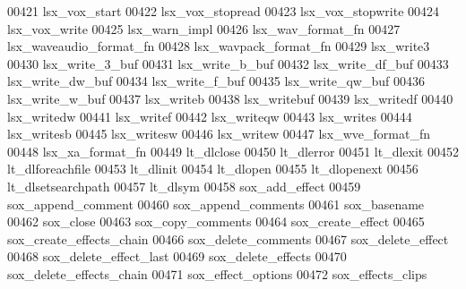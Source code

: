 \begin{DoxyCode}
00421 \textcolor{stringliteral}{lsx\_vox\_start}
00422 \textcolor{stringliteral}{lsx\_vox\_stopread}
00423 \textcolor{stringliteral}{lsx\_vox\_stopwrite}
00424 \textcolor{stringliteral}{lsx\_vox\_write}
00425 \textcolor{stringliteral}{lsx\_warn\_impl}
00426 \textcolor{stringliteral}{lsx\_wav\_format\_fn}
00427 \textcolor{stringliteral}{lsx\_waveaudio\_format\_fn}
00428 \textcolor{stringliteral}{lsx\_wavpack\_format\_fn}
00429 \textcolor{stringliteral}{lsx\_write3}
00430 \textcolor{stringliteral}{lsx\_write\_3\_buf}
00431 \textcolor{stringliteral}{lsx\_write\_b\_buf}
00432 \textcolor{stringliteral}{lsx\_write\_df\_buf}
00433 \textcolor{stringliteral}{lsx\_write\_dw\_buf}
00434 \textcolor{stringliteral}{lsx\_write\_f\_buf}
00435 \textcolor{stringliteral}{lsx\_write\_qw\_buf}
00436 \textcolor{stringliteral}{lsx\_write\_w\_buf}
00437 \textcolor{stringliteral}{lsx\_writeb}
00438 \textcolor{stringliteral}{lsx\_writebuf}
00439 \textcolor{stringliteral}{lsx\_writedf}
00440 \textcolor{stringliteral}{lsx\_writedw}
00441 \textcolor{stringliteral}{lsx\_writef}
00442 \textcolor{stringliteral}{lsx\_writeqw}
00443 \textcolor{stringliteral}{lsx\_writes}
00444 \textcolor{stringliteral}{lsx\_writesb}
00445 \textcolor{stringliteral}{lsx\_writesw}
00446 \textcolor{stringliteral}{lsx\_writew}
00447 \textcolor{stringliteral}{lsx\_wve\_format\_fn}
00448 \textcolor{stringliteral}{lsx\_xa\_format\_fn}
00449 \textcolor{stringliteral}{lt\_dlclose}
00450 \textcolor{stringliteral}{lt\_dlerror}
00451 \textcolor{stringliteral}{lt\_dlexit}
00452 \textcolor{stringliteral}{lt\_dlforeachfile}
00453 \textcolor{stringliteral}{lt\_dlinit}
00454 \textcolor{stringliteral}{lt\_dlopen}
00455 \textcolor{stringliteral}{lt\_dlopenext}
00456 \textcolor{stringliteral}{lt\_dlsetsearchpath}
00457 \textcolor{stringliteral}{lt\_dlsym}
00458 \textcolor{stringliteral}{sox\_add\_effect}
00459 \textcolor{stringliteral}{sox\_append\_comment}
00460 \textcolor{stringliteral}{sox\_append\_comments}
00461 \textcolor{stringliteral}{sox\_basename}
00462 \textcolor{stringliteral}{sox\_close}
00463 \textcolor{stringliteral}{sox\_copy\_comments}
00464 \textcolor{stringliteral}{sox\_create\_effect}
00465 \textcolor{stringliteral}{sox\_create\_effects\_chain}
00466 \textcolor{stringliteral}{sox\_delete\_comments}
00467 \textcolor{stringliteral}{sox\_delete\_effect}
00468 \textcolor{stringliteral}{sox\_delete\_effect\_last}
00469 \textcolor{stringliteral}{sox\_delete\_effects}
00470 \textcolor{stringliteral}{sox\_delete\_effects\_chain}
00471 \textcolor{stringliteral}{sox\_effect\_options}
00472 \textcolor{stringliteral}{sox\_effects\_clips}

\end{DoxyCode}
